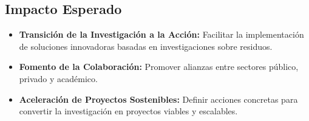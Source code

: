 \documentclass[11pt,a4paper]{article}
\begin{document}
\subsection{Impacto Esperado}
\begin{itemize}[leftmargin=*, label={--}]
    \item \textbf{Transición de la Investigación a la Acción:} Facilitar la implementación de soluciones innovadoras basadas en investigaciones sobre residuos.
    \item \textbf{Fomento de la Colaboración:} Promover alianzas entre sectores público, privado y académico.
    \item \textbf{Aceleración de Proyectos Sostenibles:} Definir acciones concretas para convertir la investigación en proyectos viables y escalables.
\end{itemize}

\newpage

\end{document}
